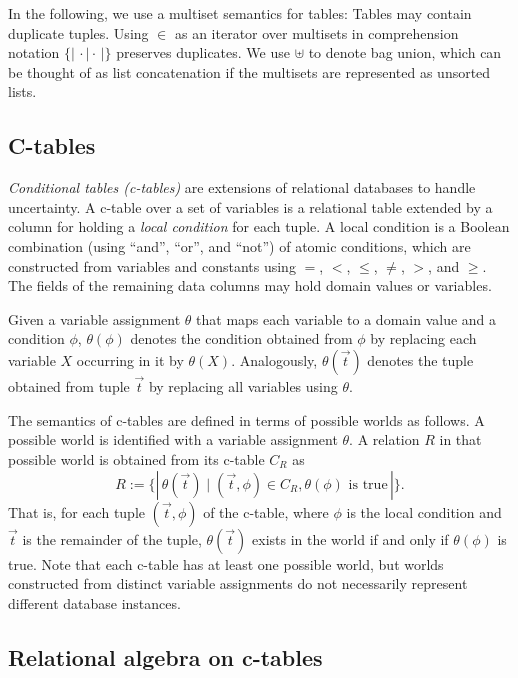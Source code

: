 
\def\bagopen{\{\!|\,}
\def\bagclose{\,|\!\}}


In the following, we use a multiset semantics for tables: Tables may
contain duplicate tuples. Using $\in$ as an iterator over multisets in
comprehension notation $\bagopen \cdot \mid \cdot \bagclose$ preserves
duplicates. We use $\uplus$ to denote bag union, which can be thought of
as list concatenation if the multisets are represented as unsorted lists.


\subsection{C-tables}


{\em Conditional tables  (c-tables)}\/ \cite{IL1984} are extensions of
relational databases to handle  uncertainty. A c-table  over
a set  of variables is  a relational table
extended by a  column for holding a \textit{local  condition} for each
tuple.   A local condition  is a  Boolean combination  (using ``and'',
``or'', and ``not'') of  atomic conditions, which are constructed from
variables  and constants  using  $=$, $<$,  $\leq$,  $\neq$, $>$,  and
$\geq$.   The fields  of the  remaining data  columns may  hold domain
values or variables.

Given  a variable  assignment $\theta$  that maps  each variable  to a
domain  value  and  a  condition $\phi$,  $\theta(\phi)$  denotes  the
condition  obtained  from  $\phi$   by  replacing  each  variable  $X$
occurring  in  it   by  $\theta(X)$.   Analogously,  $\theta(\vec{t})$
denotes  the tuple  obtained  from tuple  $\vec{t}$  by replacing  all
variables using $\theta$.

The semantics  of c-tables are defined  in terms of  possible worlds as
follows.  A  possible world is  identified with a  variable assignment
$\theta$.  A relation $R$ in  that possible world is obtained from its
c-table $C_R$ as
$$R  :=  \bagopen  \theta(\vec{t})   \mid  (\vec{t},  \phi)  \in  C_R,
   \theta(\phi) \mbox{  is true} \bagclose.$$ That is,  for each tuple
   $(\vec{t},  \phi)$  of  the  c-table,  where $\phi$  is  the  local
   condition   and  $\vec{t}$   is   the  remainder   of  the   tuple,
   $\theta(\vec{t})$ exists in the world if and only if $\theta(\phi)$
   is true.  Note  that each c-table has at  least one possible world,
   but worlds  constructed from  distinct variable assignments  do not
   necessarily represent different database instances.



\subsection{Relational algebra on c-tables}


